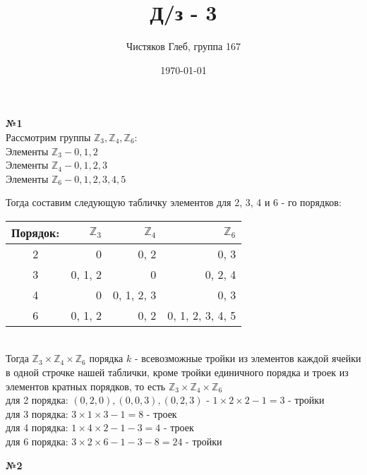 \documentclass[a4paper, 12pt]{article}
\title{Д/з - 3}
\author{Чистяков Глеб, группа 167}
\date{\today}
\begin{document}
	
	\maketitle
	
	\textbf{№1} \\
	
	Рассмотрим группы $\mathbb Z_3, \mathbb Z_4, \mathbb Z_6:$ \\
	Элементы $\mathbb Z_3 - 0, 1, 2$ \\
	Элементы $\mathbb Z_4 - 0, 1, 2, 3$ \\
	Элементы $\mathbb Z_6 - 0, 1, 2, 3, 4, 5$
	
	Тогда составим следующую табличку элементов для 2, 3, 4 и 6 - го порядков: \\
	\begin{tabular}{|c|r|r|r|} \hline
	Порядок:  & $ \mathbb Z_3 $ & $ \mathbb Z_4 $ & $ \mathbb Z_6 $  \\ \hline
	2 & 0 & 0, 2 & 0, 3  \\ \hline
	3 & 0, 1, 2 & 0 & 0, 2, 4  \\ \hline
	4 & 0 & 0, 1, 2, 3 & 0, 3 \\ \hline
	6 & 0, 1, 2 & 0, 2 & 0, 1, 2, 3, 4, 5 \\ \hline
	\end{tabular} \\

	Тогда $\mathbb Z_3 \times \mathbb Z_4 \times \mathbb Z_6$ порядка $k$ - всевозможные тройки из элементов каждой ячейки в одной строчке нашей таблички, кроме тройки единичного порядка и троек из элементов кратных порядков, то есть $\mathbb Z_3 \times \mathbb Z_4 \times \mathbb Z_6$ \\
	для 2 порядка: $(0, 2, 0), (0, 0, 3), (0, 2, 3)$ - $1 \times 2 \times 2 - 1 = 3$ - тройки\\
	для 3 порядка: $3 \times 1 \times 3 - 1 = 8$ - троек \\
	для 4 порядка: $1 \times 4 \times 2 - 1 - 3 = 4$ - троек \\
	для 6 порядка: $3 \times 2 \times 6 - 1 - 3 - 8 = 24$ - тройки \\
	\newline\newline\newline\newline\newline\newline\newline
	
	\textbf{№2} \\
	
\end{document}
